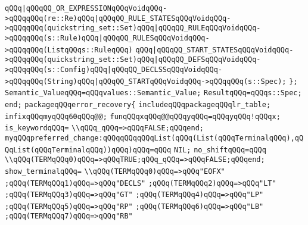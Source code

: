 \verb|qQQq|\verb#|qQQqQQ_OR_EXPRESSIONqQQqVoidqQQq->qQQqqQQq(re::Re)qQQq|qQQqQQ_RULE_STATESqQQqVoidqQQq->qQQqqQQq(quickstring_set::Set)qQQq|qQQqQQ_RULEqQQqVoidqQQq->qQQqqQQq(s::Rule)qQQq|qQQqQQ_RULESqQQqVoidqQQq->qQQqqQQq(ListqQQqs::RuleqQQq)#\newline
\verb|qQQq|\verb#|qQQqQQ_START_STATESqQQqVoidqQQq->qQQqqQQq(quickstring_set::Set)qQQq|qQQqQQ_DEFSqQQqVoidqQQq->qQQqqQQq(s::Config)qQQq|qQQqQQ_DECLSSqQQqVoidqQQq->qQQqqQQq(String)qQQq|qQQqQQ_STARTqQQqVoidqQQq->qQQqqQQq(s::Spec);#\newline
\verb|};|\newline
\verb|Semantic_ValueqQQq=qQQqvalues::Semantic_Value;|\newline
\verb|ResultqQQq=qQQqs::Spec;|\newline
\verb|end;|\newline
\verb|packageqQQqerror_recovery{|\newline
\verb|includeqQQqpackageqQQqlr_table;|\newline
\verb|infixqQQqmyqQQq60qQQq@@;|\newline
\verb|funqQQqxqQQq@@qQQqyqQQq=qQQqyqQQq!qQQqx;|\newline
\verb|is_keywordqQQq=|\newline
\verb|\\qQQq_qQQq=>qQQqFALSE;qQQqend;|\newline
\verb|myqQQqpreferred_change:qQQqqQQqqQQqList(qQQq(List(qQQqTerminalqQQq),qQQqList(qQQqTerminalqQQq))qQQq)qQQq=qQQq|\newline
\verb|NIL;|\newline
\verb|no_shiftqQQq=qQQq|\newline
\verb|\\qQQq(TERMqQQq0)qQQq=>qQQqTRUE;qQQq_qQQq=>qQQqFALSE;qQQqend;|\newline
\verb|show_terminalqQQq=|\newline
\verb|\\qQQq(TERMqQQq0)qQQq=>qQQq"EOFX"|\newline
\verb|;qQQq(TERMqQQq1)qQQq=>qQQq"DECLS"|\newline
\verb|;qQQq(TERMqQQq2)qQQq=>qQQq"LT"|\newline
\verb|;qQQq(TERMqQQq3)qQQq=>qQQq"GT"|\newline
\verb|;qQQq(TERMqQQq4)qQQq=>qQQq"LP"|\newline
\verb|;qQQq(TERMqQQq5)qQQq=>qQQq"RP"|\newline
\verb|;qQQq(TERMqQQq6)qQQq=>qQQq"LB"|\newline
\verb|;qQQq(TERMqQQq7)qQQq=>qQQq"RB"|\newline
